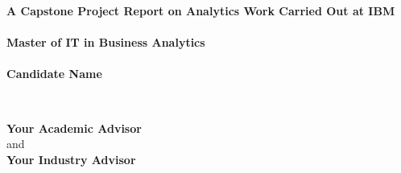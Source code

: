 \documentclass[titlepage,a4paper,12pt,thmsb]{report}
\begin{document}
\begin{titlepage}
\thispagestyle{empty}
\begin{center}
{\LARGE \bf{ A Capstone Project Report on Analytics Work Carried Out at IBM}} \\
\vspace{2.0cm}
 \\
\vskip 0.5cm
\bf{Master of IT in Business Analytics} \\
\vspace{0.5cm}
{} \\
\vspace{0.5cm}
\rm
{\large \bf {Candidate Name}}\\

\vspace{1cm}

{} \\
\vspace{.5cm}

\hspace{.05cm} {\bf {Your Academic Advisor}}\\
\hspace{.05cm} {\sc and}\\
\hspace{.05cm} {\bf {Your Industry Advisor}}\\
\vspace{0.5cm}
\vspace{0.5cm}

\begin{figure}[h]
{\par}
\end{figure}


\end{center}
\end{titlepage}
\end{document}
